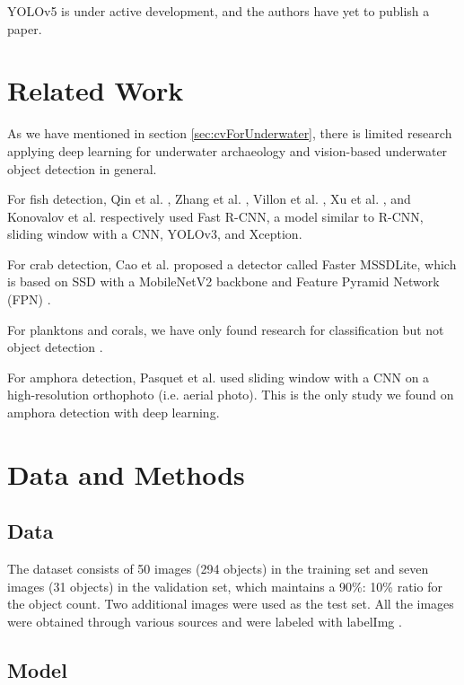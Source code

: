 \documentclass[a4paper, 11pt, oneside]{article}
\begin{document}
YOLOv5 \cite{yolov5} is under active development, and the authors have yet to publish a paper.

\section{Related Work}

As we have mentioned in section \ref{sec:cvForUnderwater}, there is limited research applying deep learning for underwater
archaeology and vision-based underwater object detection in general.

For fish detection, Qin et al. \cite{qin2015underwater, li2015fast}, Zhang et al. \cite{zhang2016unsupervised},
Villon et al. \cite{villon2016coral}, Xu et al. \cite{xu2018underwater}, and Konovalov et al.
\cite{konovalov2019underwater} respectively used Fast R-CNN, a model similar to R-CNN, sliding window with a CNN,
YOLOv3, and Xception.

For crab detection, Cao et al. \cite{cao2020real} proposed a detector called Faster MSSDLite, which is based on SSD with
a MobileNetV2 backbone and Feature Pyramid Network (FPN) \cite{lin2017feature}.

For planktons and corals, we have only found research for classification but not object detection
\cite{qin2015underwater, moniruzzaman2017deep}.

For amphora detection, Pasquet et al. \cite{mccarthy20193d, pasquet2017amphora} used sliding window with a CNN on a
high-resolution orthophoto (i.e. aerial photo). This is the only study we found on amphora detection with deep learning.

\section{Data and Methods}

\subsection{Data}

The dataset consists of 50 images (294 objects) in the training set and seven images (31 objects) in the validation set,
which maintains a 90\%: 10\% ratio for the object count. Two additional images were used as the test set. All the
images were obtained through various sources
\cite{googleimages, scuba, itinari, whoi, phoenician, auscape, hakai, groplan, ionian, sanisera} and were labeled
with labelImg \cite{labelimg}.

\subsection{Model}
\end{document}

